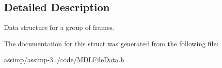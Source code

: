 \subsection{Detailed Description}
Data structure for a group of frames. 

The documentation for this struct was generated from the following file\+:\begin{DoxyCompactItemize}
\item 
assimp/assimp-\/3../code/\hyperlink{_m_d_l_file_data_8h}{M\+D\+L\+File\+Data.\+h}\end{DoxyCompactItemize}

